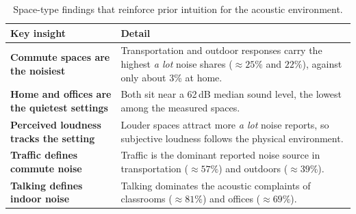 \begin{table}[htbp]
\centering
\caption{Space-type findings that reinforce prior intuition for the acoustic environment.}
\label{tab:insights-acoustic}
\footnotesize
\renewcommand{\arraystretch}{1.3}
\begin{tabularx}{\textwidth}{@{}>{\raggedright\arraybackslash\bfseries}p{} >{\raggedright\arraybackslash}X@{}}
\toprule
\normalfont\textbf{Key insight} & \textbf{Detail} \\
\midrule
Commute spaces are the noisiest & Transportation and outdoor responses carry the highest \emph{a lot} noise shares ($\approx 25\%$ and $22\%$), against only about 3\% at home. \\
Home and offices are the quietest settings & Both sit near a 62\,dB median sound level, the lowest among the measured spaces. \\
Perceived loudness tracks the setting & Louder spaces attract more \emph{a lot} noise reports, so subjective loudness follows the physical environment. \\
Traffic defines commute noise & Traffic is the dominant reported noise source in transportation ($\approx 57\%$) and outdoors ($\approx 39\%$). \\
Talking defines indoor noise & Talking dominates the acoustic complaints of classrooms ($\approx 81\%$) and offices ($\approx 69\%$). \\
\bottomrule
\end{tabularx}
\end{table}
